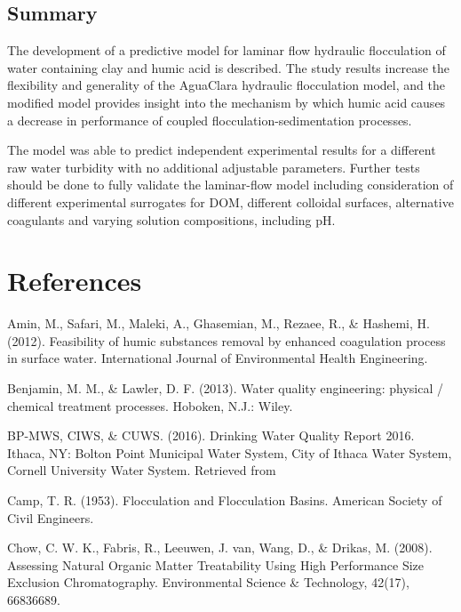 \documentclass[letterpaper,10pt,english]{sphinxmanual}
\begin{document}
\subsection{Summary}
\label{\detokenize{Flocculation/Floc_Model:summary}}
The development of a predictive model for laminar flow hydraulic flocculation of water containing clay and humic acid is described. The study results increase the flexibility and generality of the AguaClara hydraulic flocculation model, and the modified model provides insight into the mechanism by which humic acid causes a decrease in performance of coupled flocculation-sedimentation processes.

The model was able to predict independent experimental results for a different raw water turbidity with no additional adjustable parameters. Further tests should be done to fully validate the laminar-flow model including consideration of different experimental surrogates for DOM, different colloidal surfaces, alternative coagulants and varying solution compositions, including pH.


\section{References}
\label{\detokenize{Flocculation/Floc_Model:references}}
Amin, M., Safari, M., Maleki, A., Ghasemian, M., Rezaee, R., \& Hashemi, H. (2012). Feasibility of humic substances removal by enhanced coagulation process in surface water. International Journal of Environmental Health Engineering. 

Benjamin, M. M., \& Lawler, D. F. (2013). Water quality engineering: physical / chemical treatment processes. Hoboken, N.J.: Wiley.

BP-MWS, CIWS, \& CUWS. (2016). Drinking Water Quality Report 2016. Ithaca, NY: Bolton Point Municipal Water System, City of Ithaca Water System, Cornell University Water System. Retrieved from 

Camp, T. R. (1953). Flocculation and Flocculation Basins. American Society of Civil Engineers.

Chow, C. W. K., Fabris, R., Leeuwen, J. van, Wang, D., \& Drikas, M. (2008). Assessing Natural Organic Matter Treatability Using High Performance Size Exclusion Chromatography. Environmental Science \& Technology, 42(17), 6683\textendash{}6689. 
\end{document}

